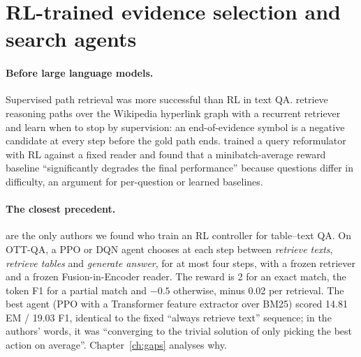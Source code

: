 \section{RL-trained evidence selection and search agents}
\label{sec:lit-search}

\paragraph{Before large language models.} Supervised path retrieval was more successful than RL in text QA. \citet{asai2020learning} retrieve reasoning paths over the Wikipedia hyperlink graph with a recurrent retriever and learn when to stop by supervision: an end-of-evidence symbol is a negative candidate at every step before the gold path ends. \citet{das2019multistep} trained a query reformulator with RL against a fixed reader and found that a minibatch-average reward baseline ``significantly degrades the final performance'' because questions differ in difficulty, an argument for per-question or learned baselines.

\paragraph{The closest precedent.} \citet{jose2024qatexttablesdrl} are the only authors we found who train an RL controller for table--text QA. On OTT-QA, a PPO or DQN agent chooses at each step between \emph{retrieve texts}, \emph{retrieve tables} and \emph{generate answer}, for at most four steps, with a frozen retriever and a frozen Fusion-in-Encoder reader. The reward is 2 for an exact match, the token F1 for a partial match and $-0.5$ otherwise, minus 0.02 per retrieval. The best agent (PPO with a Transformer feature extractor over BM25) scored 14.81 EM / 19.03 F1, identical to the fixed ``always retrieve text'' sequence; in the authors' words, it was ``converging to the trivial solution of only picking the best action on average''. Chapter~\ref{ch:gaps} analyses why.

